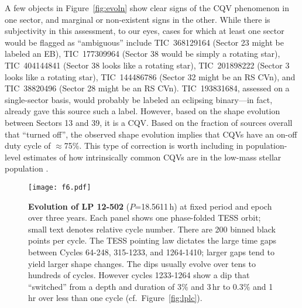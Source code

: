 \documentclass[11pt,twocolumn,tighten]{aastex63}
\begin{document}
A few objects in Figure~\ref{fig:evoln}
show clear signs of
the CQV phenomenon in one sector, and marginal or non-existent signs
in the other.  While there is subjectivity in this assessment, to our
eyes, cases for which at least one sector would be flagged as
``ambiguous'' include
TIC~368129164 (Sector 23 might be labeled an EB),
TIC~177309964 (Sector 38 would be simply a rotating star),
TIC~404144841 (Sector 38 looks like a rotating star),
TIC~201898222 (Sector 3 looks like a rotating star),
TIC~144486786 (Sector 32 might be an RS CVn),
and
TIC~38820496 (Sector 28 might be an RS CVn).
TIC~193831684, assessed on a single-sector basis, would probably be
labeled an eclipsing binary---in fact, \citet{2021ApJ...912..123J}
already gave this source such a label.  However,
based on the shape evolution between Sectors 13 and 39, it is a
CQV.  Based on the fraction of sources overall that ``turned off'',
the observed shape evolution implies that CQVs have an on-off duty cycle of
$\approx$75\%.  This type of correction is worth including in
population-level estimates of how intrinsically common CQVs are in the
low-mass stellar population \citep[e.g.][]{2022AJ....163..144G}.



\begin{figure*}[!t]
	\begin{center}
		\centering
		\texttt{[image: f6.pdf]}
		\vspace{-0.3cm}
		\caption{
			{\bf Evolution of LP 12-502} ($P$=18.5611\,h) at fixed period and
			epoch over three years.  Each panel shows one phase-folded TESS
			orbit; small text denotes relative cycle number.  There are 200
			binned black points per cycle.  The TESS pointing law dictates
			the large time gaps between Cycles 64-248, 315-1233, and
			1264-1410; larger gaps tend to yield larger shape changes.  The
			dips usually evolve over tens to hundreds of cycles.  However
			cycles 1233-1264 show a dip that ``switched'' from a depth and
			duration of 3\% and 3\,hr to 0.3\% and 1\,hr over less than one
			cycle (cf.~Figure~\ref{fig:lplc}).
		}
		\label{fig:lp}
	\end{center}
\end{figure*}
\end{document}
